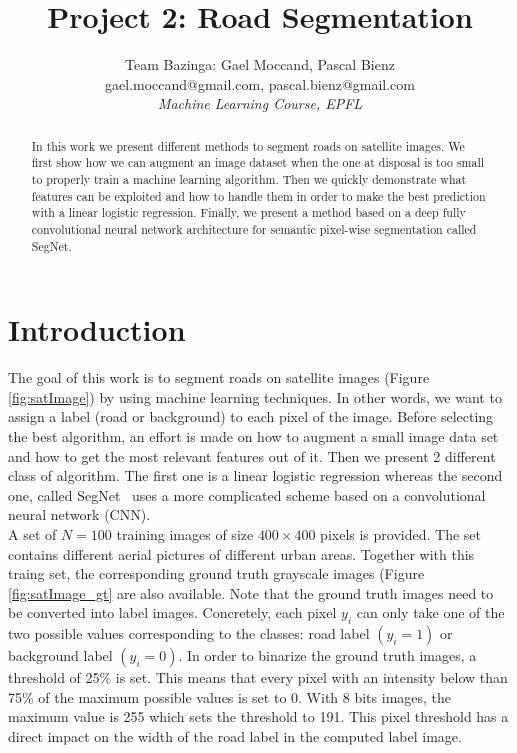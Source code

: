 \documentclass[10pt,conference,compsocconf]{IEEEtran}
\begin{document}
\title{Project 2: Road Segmentation}

\author{
  Team Bazinga:
  Gael Moccand, Pascal Bienz\\
  gael.moccand@gmail.com, pascal.bienz@gmail.com\\
  \textit{Machine Learning Course, EPFL}
}

\maketitle

\begin{abstract}
In this work we present different methods to segment roads on satellite images. We first show how we can augment an image dataset when the one at disposal is too small to properly train a machine learning algorithm. Then we quickly demonstrate what features can be exploited and how to handle them in order to make the best prediction with a linear logistic regression. Finally, we present a method based on a deep fully convolutional neural network architecture for semantic pixel-wise segmentation called SegNet.
\end{abstract}

\section{Introduction}
The goal of this work is to segment roads on satellite images (Figure \ref{fig:satImage}) by using machine learning techniques. In other words, we want to assign a label (road or background) to each pixel of the image. Before selecting the best algorithm, an effort is made on how to augment a small image data set and how to get the most relevant features out of it. Then we present 2 different class of algorithm. The first one is a linear logistic regression whereas the second one, called SegNet~\cite{segnet} uses a more complicated scheme based on a convolutional neural network (CNN).\\

A set of $N = 100$ training images of size $400 \times 400$ pixels is provided. The set contains different aerial pictures of different urban areas. Together with this traing set, the corresponding ground truth grayscale images (Figure \ref{fig:satImage_gt} are also available. Note that the ground truth images need to be converted into label images. Concretely, each pixel $y_i$ can only take one of the two possible values corresponding to the classes: road label $(y_i=1)$ or background label $(y_i=0)$. In order to binarize the ground truth images, a threshold of 25\% is set. This means that every pixel with an intensity below than 75\% of the maximum possible values is set to 0. With 8 bits images, the maximum value is 255 which sets the threshold to 191. This pixel threshold has a direct impact on the width of the road label in the computed label image.\\
\end{document}
